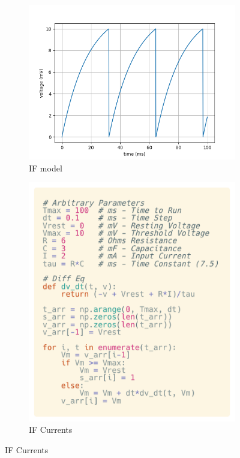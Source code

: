 \begin{figure}[h]
    \begin{subfigure}{.5\textwidth}
        \centering
        \includegraphics[width=.9\linewidth]{figures/graphs/singleSpikingNeuron.png}
        \caption{IF model}
        \label{fig:LIFSingleSpikeGraph}
    \end{subfigure}%
    \begin{subfigure}{.8\textwidth}
        \centering
        \includegraphics[width=.7\linewidth]{figures/code/SingleLIFCode.png}
        \caption{IF Currents}
        \label{fig:LIFCode}
    \end{subfigure}
    \label{fig:LIFSingleSpikeGraphCode}
\end{figure}



